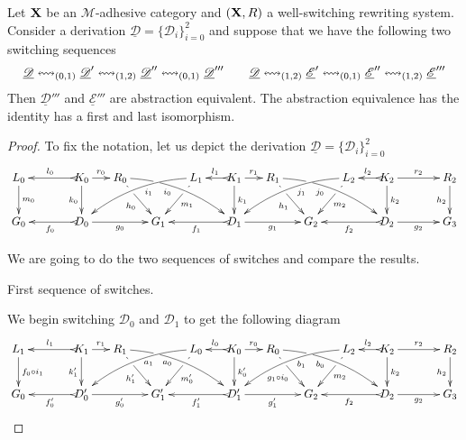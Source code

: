 \documentclass[a4paper,UKenglish,cleveref,pdftex,thm-restate,numberwithinsect]{lipics-v2021}
\def\R{\mathsf{R}}
\def\X{\textbf {\textup{X}}}
\def\G{\textbf {\textup{G}}}
\newcommand{\dder}[1]{\mathscr{#1}}
\newcommand{\der}[1]{\underline{\dder{#1}}}
\newcommand{\shift}[1]{\ensuremath{\mathrel{{\leftrightsquigarrow}_{#1}}}}
\begin{document}
\begin{lemma}Let $\X$ be an $\mathcal{M}$-adhesive category and $(\X,\R)$ a well-switching rewriting system.
	Consider a derivation $\der{D}=\{\dder{D}_i\}_{i=0}^2$ and suppose that we have the following two switching sequences
	\[\der{D} \shift{(0,1)} \der{D}' \shift{(1,2)} \der{D}'' \shift{(0,1)}\der{D}'''\\
	\qquad \der{D}\shift{(1,2)}\der{E}'\shift{(0,1)} \der{E}'' \shift{(1,2)}\der{E}''' \]
	Then $\der{D}'''$ and $\der{E}'''$ are abstraction equivalent. The abstraction equivalence has the identity has a first and last isomorphism.
\end{lemma}
\begin{proof}
	To fix the notation, let us depict the derivation $\der{D}=\{\dder{D}_i\}_{i=0}^2$
	\[\xymatrix@C=15pt{L_0\ar[d]^{m_0}&& K_0 \ar[d]_{k_0}\ar@{>->}[ll]_{l_0} \ar[r]^{r_0} & R_0 \ar@/^.35cm/[drrr]_(.4){i_0}|(.29)\hole \ar[dr]|(.28)\hole_{h_0} && L_1 \ar@/_.35cm/[dlll]^(.4){i_1} \ar[dl]|(.28)\hole^{m_1}& K_1 \ar[d]^{k_1}\ar@{>->}[l]_{l_1} \ar[r]^{r_1} & R_1 \ar[dr]|(.28)\hole_{h_1} \ar@/^.35cm/[drrr]_(.4){j_0}|(.29)\hole  && L_2 \ar@/_.35cm/[dlll]^(.4){j_1} \ar[dl]|(.28)\hole^{m_2}& K_2 \ar[d]^{k_2}\ar@{>->}[l]_{l_2} \ar[rr]^{r_2} && R_2 \ar[d]_{h_2} \\G_0 && \ar@{>->}[ll]^{f_0} D_0 \ar[rr]_{g_0}&& G_1  && \ar@{>->}[ll]^{f_1} D_1 \ar[rr]_{g_1}&& G_2 && \ar@{>->}[ll]^{f_2} D_2 \ar[rr]_{g_2}&& G_3 }\]
	
	We are going to do the two sequences of switches and compare the results.
	
	\smallskip \noindent First sequence of switches.
	
	We begin switching $\dder{D}_0$ and $\dder{D}_1$ to get the following diagram
	\[\xymatrix@C=15pt{L_1\ar[d]^{f_0\circ i_1}&& K_1 \ar[d]_{k'_1}\ar@{>->}[ll]_{l_1} \ar[r]^{r_1} & R_1 \ar@/^.35cm/[drrr]_(.4){a_0}|(.29)\hole \ar[dr]|(.28)\hole_{h'_1} && L_0 \ar@/_.35cm/[dlll]^(.4){a_1} \ar[dl]|(.28)\hole^{m'_0}& K_0 \ar[d]^{k'_0}\ar@{>->}[l]_{l_0} \ar[r]^{r_0} & R_0 \ar[dr]|(.28)\hole_{g_1\circ i_0} \ar@/^.35cm/[drrr]_(.4){b_0}|(.29)\hole  && L_2 \ar@/_.35cm/[dlll]^(.4){b_1} \ar[dl]|(.28)\hole^{m_2}& K_2 \ar[d]^{k_2}\ar@{>->}[l]_{l_2} \ar[rr]^{r_2} && R_2 \ar[d]_{h_2} \\G_0 && \ar@{>->}[ll]^{f'_0} D'_0 \ar[rr]_{g'_0}&& G'_1  && \ar@{>->}[ll]^{f'_1} D'_1 \ar[rr]_{g'_1}&& G_2 && \ar@{>->}[ll]^{f_2} D_2 \ar[rr]_{g_2}&& G_3 }\]
	

\end{proof}
\end{document}
